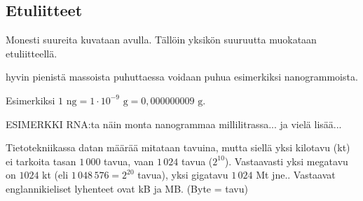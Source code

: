 \subsection*{Etuliitteet}

Monesti suureita kuvataan  avulla. Tällöin yksikön suuruutta muokataan etuliitteellä.



\begin{esimerkki}

hyvin pienistä massoista puhuttaessa voidaan puhua esimerkiksi nanogrammoista.

Esimerkiksi $1 \textrm{ ng} = 1 \cdot 10^{-9} \textrm{ g} = 0,000000009 \textrm{ g} $.

ESIMERKKI RNA:ta näin monta nanogrammaa millilitrassa... ja vielä lisää...

\end{esimerkki}

Tietotekniikassa datan määrää mitataan tavuina, mutta siellä yksi kilotavu (kt) ei tarkoita tasan $1\,000$ tavua,  vaan $1\,024$ tavua ($2^{10}$). Vastaavasti yksi megatavu on $1024$ kt (eli $1\,048\,576 = 2^{20}$ tavua), yksi gigatavu $1\,024$ Mt jne.. Vastaavat englannikieliset lyhenteet ovat kB ja MB. (Byte = tavu)

